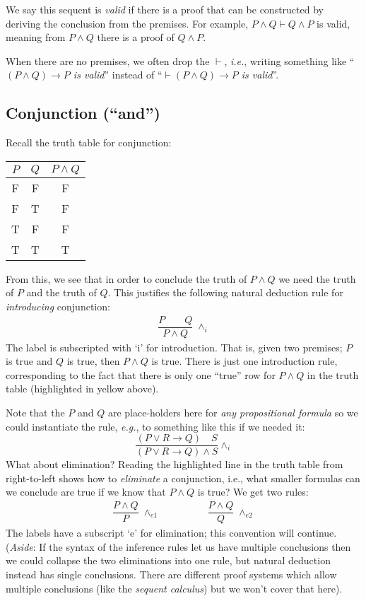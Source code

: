 \documentclass{article}
\theoremstyle{definition}
\newcommand{\ie}{\emph{i.e.}}
\newcommand{\eg}{\emph{e.g.}}
\begin{document}
We say this sequent is \emph{valid} if there is a proof that can be
constructed by deriving the conclusion from the premises. For example,
$P \wedge Q \vdash Q \wedge P$ is valid, meaning from $P \wedge Q$
there is a proof of $Q \wedge P$.

When there are no premises, we often drop the $\vdash$, \ie{},
writing something like ``\emph{$(P \wedge Q) \rightarrow P$ is valid}''
instead of ``\emph{$\vdash (P \wedge Q) \rightarrow P$ is
valid}''.

\subsection{Conjunction (``and'')}

Recall the truth table for conjunction:
%
\begin{center}
\begin{tabular}{cc|c}
  $P$ & $Q$ & $P \wedge Q$ \\ \hline
  F & F & F \\
  F & T & F \\
  T & F & F \\
\rowcolor{yellow}  T & T & T
\end{tabular}
\end{center}
%
From this, we see that in order to conclude the truth of $P \wedge Q$
we need the truth of $P$ and the truth of $Q$. This justifies the
following natural deduction rule for \emph{introducing} conjunction:
%
\begin{align*}
  \dfrac{P \qquad Q}
        {P \wedge Q} \; {\wedge_i}
\end{align*}
%
The label is subscripted with `i' for introduction.
That is, given two premises; $P$ is true and $Q$ is true, then
$P \wedge Q$ is true. There is just one introduction rule,
corresponding to the fact that there is only one ``true'' row
for $P \wedge Q$ in the truth table (highlighted in yellow above).

Note that the $P$ and $Q$ are place-holders here for \emph{any
  propositional formula} so we could instantiate the rule, \eg{},
to something like this if we needed it:
%
\begin{equation*}
\dfrac{(P \vee R \rightarrow Q) \quad S}
      {(P \vee R \rightarrow Q) \wedge S} {\wedge_i}
\end{equation*}
%
What about elimination?
Reading the highlighted line in the truth table from right-to-left shows how to
\emph{eliminate} a conjunction, i.e., what smaller formulas
can we conclude are true if we know that $P \wedge Q$ is true? We get
two rules:
%
\begin{align*}
  \dfrac{P \wedge Q}
        {P} \; {\wedge_{e1}}
  \qquad & \qquad
      \dfrac{P \wedge Q}
        {Q} \; {\wedge_{e2}}
\end{align*}
%
The labels have a subscript `e' for elimination; this convention will
continue.  (\emph{Aside}: If the syntax of the inference rules let us
have multiple conclusions then we could collapse the two eliminations
into one rule, but natural deduction instead has single
conclusions. There are different proof systems which allow
multiple conclusions (like the \emph{sequent calculus}) but we won't cover that here).
\end{document}
